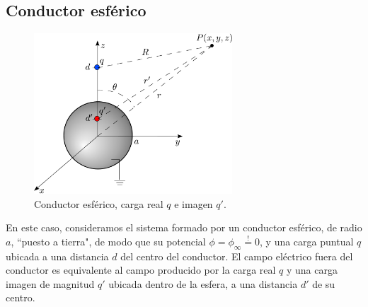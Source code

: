 \subsection{Conductor esférico}
\begin{figure}[!h]
\centerline{\includegraphics[height=6cm]{fig/fig-carga-imagen-02.pdf}}
\caption{Conductor esférico, carga real $q$ e imagen $q'$.}
\label{ci02}
\end{figure}
En este caso, consideramos el sistema formado por un conductor esférico, de radio $a$, ``puesto a tierra", de modo que su potencial $\phi=\phi_\infty\stackrel{!}{=}0$, y una carga puntual $q$ ubicada a una distancia $d$ del centro del conductor. El campo eléctrico fuera del conductor es equivalente al campo producido por la carga real $q$ y una carga imagen de magnitud $q'$ ubicada dentro de la esfera, a una distancia $d'$ de su centro. 

